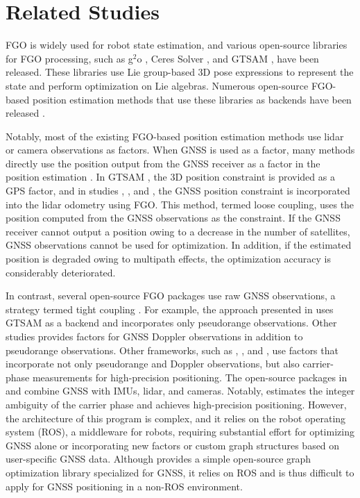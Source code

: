 \section{Related Studies}
FGO is widely used for robot state estimation, and various open-source libraries for FGO processing, such as g$^2$o \cite{g2o}, Ceres Solver \cite{ceres}, and GTSAM \cite{gtsam}, have been released. These libraries use Lie group-based 3D pose expressions to represent the state and perform optimization on Lie algebras. Numerous open-source FGO-based position estimation methods that use these libraries as backends have been released \cite{fgo_general1,fgo_book,orbslam,cartographer}.

Notably, most of the existing FGO-based position estimation methods use lidar or camera observations as factors. When GNSS is used as a factor, many methods directly use the position output from the GNSS receiver as a factor in the position estimation \cite{cartographer,hdlslam,liosam}. In GTSAM \cite{gtsam}, the 3D position constraint is provided as a GPS factor, and in studies \cite{cartographer}, \cite{hdlslam}, and \cite{liosam}, the GNSS position constraint is incorporated into the lidar odometry using FGO. This method, termed loose coupling, uses the position computed from the GNSS observations as the constraint. If the GNSS receiver cannot output a position owing to a decrease in the number of satellites, GNSS observations cannot be used for optimization. In addition, if the estimated position is degraded owing to multipath effects, the optimization accuracy is considerably deteriorated.

In contrast, several open-source FGO packages use raw GNSS observations, a strategy termed tight coupling \cite{robustgnss,graphgnsslib,gnssfgo,posgo,gicilib}. For example, the approach presented in \cite{robustgnss} uses GTSAM as a backend and incorporates only pseudorange observations. Other studies \cite{gvins,posgo} provides factors for GNSS Doppler observations in addition to pseudorange observations. Other frameworks, such as \cite{graphgnsslib}, \cite{gnssfgo}, and \cite{gicilib}, use factors that incorporate not only pseudorange and Doppler observations, but also carrier-phase measurements for high-precision positioning. The open-source packages in \cite{gnssfgo} and \cite{gicilib} combine GNSS with IMUs, lidar, and cameras. Notably, \cite{gicilib} estimates the integer ambiguity of the carrier phase and achieves high-precision positioning. However, the architecture of this program is complex, and it relies on the robot operating system (ROS), a middleware for robots, requiring substantial effort for optimizing GNSS alone or incorporating new factors or custom graph structures based on user-specific GNSS data. Although \cite{graphgnsslib} provides a simple open-source graph optimization library specialized for GNSS, it relies on ROS and is thus difficult to apply for GNSS positioning in a non-ROS environment.


